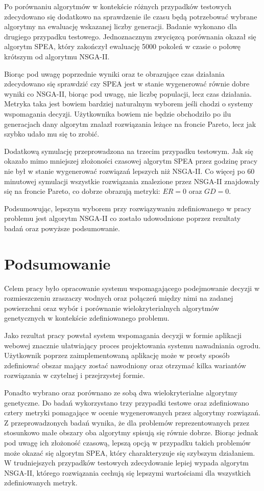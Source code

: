 \documentclass[twoside]{iisthesis}
\begin{document}
Po porównaniu algorytmów w kontekście różnych przypadków testowych zdecydowano się dodatkowo na sprawdzenie ile czasu będą potrzebować wybrane algorytmy na ewaluację wskazanej liczby generacji. Badanie wykonano dla drugiego przypadku testowego. Jednoznacznym zwycięzcą porównania okazał się algorytm SPEA, który zakończył ewaluację 5000 pokoleń w czasie o połowę krótszym od algorytmu NSGA-II.

Biorąc pod uwagę poprzednie wyniki oraz te obrazujące czas działania zdecydowano się sprawdzić czy SPEA jest w stanie wygenerować równie dobre wyniki co NSGA-II, biorąc pod uwagę, nie liczbę populacji, lecz czas działania. Metryka taka jest bowiem bardziej naturalnym wyborem jeśli chodzi o systemy wspomagania decyzji. Użytkownika bowiem nie będzie obchodziło po ilu generacjach dany algorytm znalazł rozwiązania leżące na froncie Pareto, lecz jak szybko udało mu się to zrobić.

Dodatkową symulację przeprowadzona na trzecim przypadku testowym. Jak się okazało mimo mniejszej złożoności czasowej algorytm SPEA przez godzinę pracy nie był w stanie wygenerować rozwiązań lepszych niż NSGA-II. Co więcej po 60 minutowej symulacji wszystkie rozwiązania znalezione przez NSGA-II znajdowały się na froncie Pareto, co dobrze obrazują metryki: $ER=0$ oraz $GD=0$.

Podsumowując, lepszym wyborem przy rozwiązywaniu zdefiniowanego w pracy problemu jest algorytm NSGA-II co zostało udowodnione poprzez rezultaty badań oraz powyższe podsumowanie.
\chapter{Podsumowanie}
Celem pracy było opracowanie systemu wspomagającego podejmowanie decyzji w rozmieszczeniu zraszaczy wodnych oraz połączeń między nimi na zadanej powierzchni oraz wybór i porównanie wielokryterialnych algorytmów genetycznych w kontekście zdefiniowanego problemu.

Jako rezultat pracy powstał system wspomagania decyzji w formie aplikacji webowej znacznie ułatwiający proces projektowania systemu nawadniania ogrodu. Użytkownik poprzez zaimplementowaną aplikację może w prosty sposób zdefiniować obszar mający zostać nawodniony oraz otrzymać kilka wariantów rozwiązania w czytelnej i przejrzystej formie.

Ponadto wybrano oraz porównano ze sobą dwa wielokryterialne algorytmy genetyczne. Do badań wykorzystano trzy przypadki testowe oraz zdefiniowano cztery metryki pomagające w ocenie wygenerowanych przez algorytmy rozwiązań. Z przeprowadzonych badań wynika, że dla problemów reprezentowanych przez stosunkowo małe obszary oba algorytmy spisują się równie dobrze. Biorąc jednak pod uwagę ich złożoność czasową, lepszą opcją w przypadku takich problemów może okazać się algorytm SPEA, który charakteryzuje się szybszym działaniem. W trudniejszych przypadków testowych zdecydowanie lepiej wypada algorytm NSGA-II, którego rozwiązania cechują się lepszymi wartościami dla wszystkich zdefiniowanych metryk.
\end{document}
